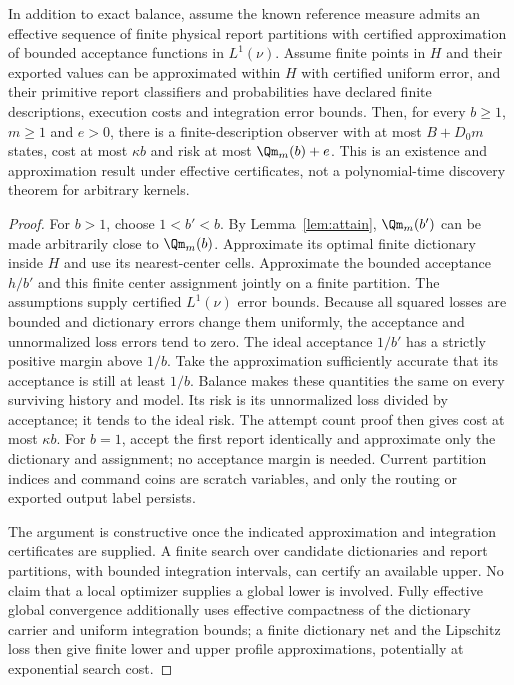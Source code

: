\begin{proposition}\label{prop:finite}
In addition to exact balance, assume the known reference measure admits an effective sequence of finite physical report partitions with certified approximation of bounded acceptance functions in $L^1(\nu)$. Assume finite points in $H$ and their exported values can be approximated within $H$ with certified uniform error, and their primitive report classifiers and probabilities have declared finite descriptions, execution costs and integration error bounds. Then, for every $b\ge1$, $m\ge1$ and $e>0$, there is a finite-description observer with at most $B+D_0m$ states, cost at most $\kappa b$ and risk at most $\Qm_m(b)+e$. This is an existence and approximation result under effective certificates, not a polynomial-time discovery theorem for arbitrary kernels.
\end{proposition}
\begin{proof}
For $b>1$, choose $1<b'<b$. By Lemma~\ref{lem:attain}, $\Qm_m(b')$ can be made arbitrarily close to $\Qm_m(b)$. Approximate its optimal finite dictionary inside $H$ and use its nearest-center cells. Approximate the bounded acceptance $h/b'$ and this finite center assignment jointly on a finite partition. The assumptions supply certified $L^1(\nu)$ error bounds. Because all squared losses are bounded and dictionary errors change them uniformly, the acceptance and unnormalized loss errors tend to zero. The ideal acceptance $1/b'$ has a strictly positive margin above $1/b$. Take the approximation sufficiently accurate that its acceptance is still at least $1/b$. Balance makes these quantities the same on every surviving history and model. Its risk is its unnormalized loss divided by acceptance; it tends to the ideal risk. The attempt count proof then gives cost at most $\kappa b$. For $b=1$, accept the first report identically and approximate only the dictionary and assignment; no acceptance margin is needed. Current partition indices and command coins are scratch variables, and only the routing or exported output label persists.

The argument is constructive once the indicated approximation and integration certificates are supplied. A finite search over candidate dictionaries and report partitions, with bounded integration intervals, can certify an available upper. No claim that a local optimizer supplies a global lower is involved. Fully effective global convergence additionally uses effective compactness of the dictionary carrier and uniform integration bounds; a finite dictionary net and the Lipschitz loss then give finite lower and upper profile approximations, potentially at exponential search cost.
\end{proof}

